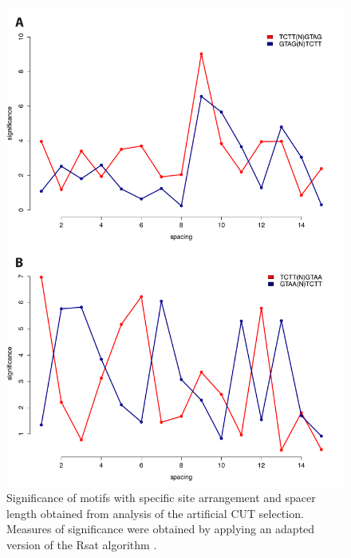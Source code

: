 \begin{figure}[hp!]

\centering
\includegraphics[width=\textwidth]{figures/results/positionalVivo}
\caption[Enrichment of Nrd1 and Nab3 sites with different arrangements and spacings in the artificial CUT selection]{Significance of motifs with specific site arrangement and spacer length obtained from analysis of the artificial CUT selection. Measures of significance were obtained by applying an adapted version of the Rsat algorithm \cite[see methods]{vanhelden:1998:extracting}.}
\label{fig:positionalVivo}

\end{figure} 

\singlespacing
